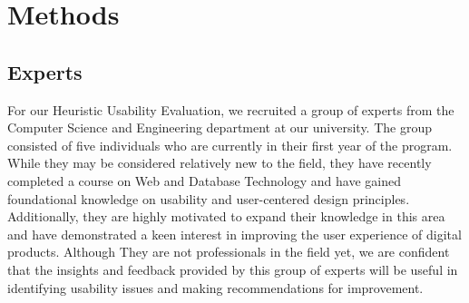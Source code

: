 \section{Methods}
\subsection{Experts}
For our Heuristic Usability Evaluation, we recruited a group of experts from the Computer Science and Engineering department at our university. The group consisted of five individuals who are currently in their first year of the program. While they may be considered relatively new to the field, they have recently completed a course on Web and Database Technology and have gained foundational knowledge on usability and user-centered design principles. 
Additionally, they are highly motivated to expand their knowledge in this area and have demonstrated a keen interest in improving the user experience of digital products. Although They are not professionals in the field yet, we are confident that the insights and feedback provided by this group of experts will be useful in identifying usability issues and making recommendations for improvement.
